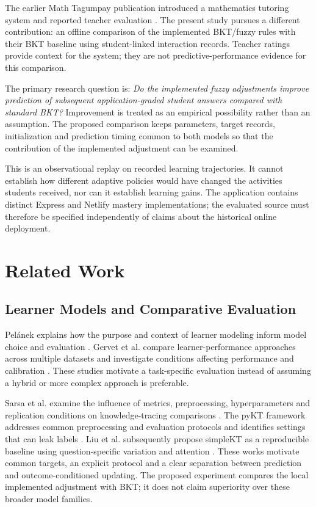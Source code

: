 \documentclass[conference]{IEEEtran}
\begin{document}
The earlier Math Tagumpay publication introduced a mathematics tutoring system and reported teacher evaluation \cite{ruiz2026}. The present study pursues a different contribution: an offline comparison of the implemented BKT/fuzzy rules with their BKT baseline using student-linked interaction records. Teacher ratings provide context for the system; they are not predictive-performance evidence for this comparison.

The primary research question is: \emph{Do the implemented fuzzy adjustments improve prediction of subsequent application-graded student answers compared with standard BKT?} Improvement is treated as an empirical possibility rather than an assumption. The proposed comparison keeps parameters, target records, initialization and prediction timing common to both models so that the contribution of the implemented adjustment can be examined.

This is an observational replay on recorded learning trajectories. It cannot establish how different adaptive policies would have changed the activities students received, nor can it establish learning gains. The application contains distinct Express and Netlify mastery implementations; the evaluated source must therefore be specified independently of claims about the historical online deployment.

\section{Related Work}
\subsection{Learner Models and Comparative Evaluation}
Pel{\'{a}}nek explains how the purpose and context of learner modeling inform model choice and evaluation \cite{pelanek2017}. Gervet et al. compare learner-performance approaches across multiple datasets and investigate conditions affecting performance and calibration \cite{gervet2020}. These studies motivate a task-specific evaluation instead of assuming a hybrid or more complex approach is preferable.

Sarsa et al. examine the influence of metrics, preprocessing, hyperparameters and replication conditions on knowledge-tracing comparisons \cite{sarsa2022}. The pyKT framework addresses common preprocessing and evaluation protocols and identifies settings that can leak labels \cite{liu2022pykt}. Liu et al. subsequently propose simpleKT as a reproducible baseline using question-specific variation and attention \cite{liu2023simplekt}. These works motivate common targets, an explicit protocol and a clear separation between prediction and outcome-conditioned updating. The proposed experiment compares the local implemented adjustment with BKT; it does not claim superiority over these broader model families.
\end{document}
